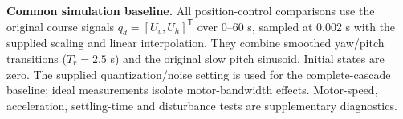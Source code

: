 \textbf{Common simulation baseline.} All position-control comparisons use the original course signals $q_d=[U_v,U_h]^\mathsf{T}$ over 0--60 s, sampled at 0.002 s with the supplied scaling and linear interpolation. They combine smoothed yaw/pitch transitions ($T_r=2.5$ s) and the original slow pitch sinusoid. Initial states are zero. The supplied quantization/noise setting is used for the complete-cascade baseline; ideal measurements isolate motor-bandwidth effects. Motor-speed, acceleration, settling-time and disturbance tests are supplementary diagnostics.
